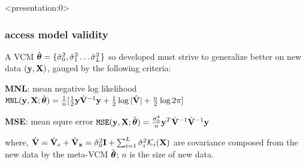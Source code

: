 \documentclass{beamer}
\begin{document}
\begin{frame}<presentation:0>
  \frametitle{access model validity}
  A VCM
  $\hat{\boldsymbol{\theta}}=\{\hat{\sigma}^2_0, \hat{\sigma}^2_1 \dots
  \hat{\sigma}^2_L\}$ so developed must strive to generalize better on
  new data $(\mathbf{y}, \mathbf{X})$, gauged by the following criteria:
  \begin{block}{\textbf{MNL}: mean negative log likelihood}
    $\mathtt{MNL}(\mathbf{y}, \mathbf{X}; \hat{\boldsymbol{\theta}}) = \frac{1}{n}
    [\frac{1}{2}\mathbf{y}\hat{\mathbf{V}}^{-1}\mathbf{y} + \frac{1}{2}\log{|\hat{\mathbf{V}}|} +
    \frac{n}{2}\log{2\pi}]$
  \end{block}
  \begin{block}{\textbf{MSE}: mean squre error}
    $\mathtt{MSE}(\mathbf{y}, \mathbf{X}; \hat{\boldsymbol{\theta}}) = \frac{\sigma_0^4}{n}
    \mathbf{y}^T\hat{\mathbf{V}}^{-1} \hat{\mathbf{V}}^{-1}\mathbf{y}$
  \end{block}
  where,
  $\hat{\mathbf{V}} = \hat{\mathbf{V}}_e + \hat{\mathbf{V}}_\mathbf{x} = \hat{\sigma}^2_0\textbf{I} +
  \sum_{i=1}^L\hat{\sigma}_i^2 \mathcal{K}_i(\mathbf{X})$ are covariance
  composed from the new data by the meta-VCM $\hat{\boldsymbol{\theta}}$; $n$ is
  the size of new data.
\end{frame}
\end{document}
